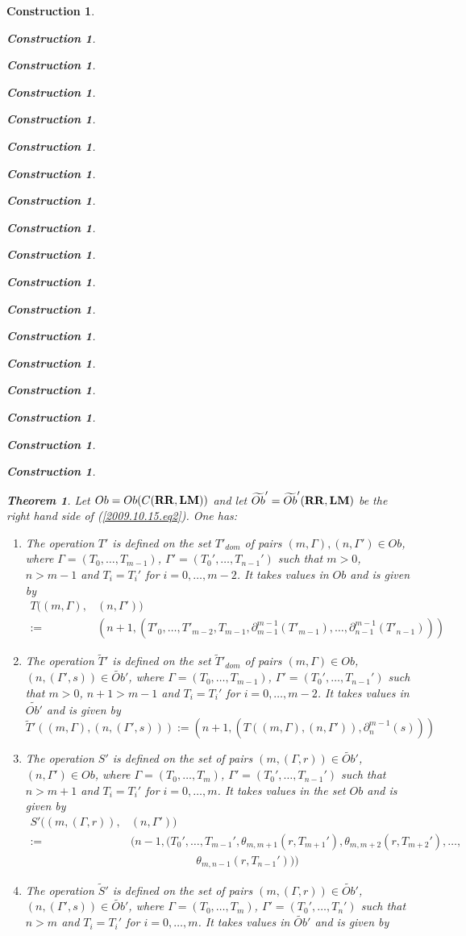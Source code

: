 \documentclass[onecolumn,12pt]{amsart}
\newtheorem{theorem}[proposition]{Theorem}
\numberwithin{proposition}{subsection}
\newtheorem{construction}[proposition]{Construction}
\newcommand{\wt}{\widetilde}
\newcommand{\spc}{{\,\,\,\,\,\,\,}}
\newcommand{\RR}{{\bf RR}}
\newcommand{\LM}{{\bf LM}}
\begin{document}
\begin{construction}
\begin{construction}
\begin{construction}
\begin{construction}
\begin{construction}
\begin{construction}
\begin{construction}
\begin{construction}
\begin{construction}
\begin{construction}
\begin{construction}
\begin{construction}
\begin{construction}
\begin{construction}
\begin{construction}
\begin{construction}
\begin{construction}
\begin{construction}
  
%
\begin{theorem}\label{2015.08.26.th2}
Let $Ob=Ob(C(\RR,\LM))$ and let $\wt{Ob}'=\wt{Ob}'(\RR,\LM)$ be the right hand side of (\ref{2009.10.15.eq2}). One has:
%
\begin{enumerate}
\item The operation $T'$ is defined on the set $T'_{dom}$ of pairs
  $(m,\Gamma),(n,\Gamma')\in Ob$, where $\Gamma=(T_0,\dots,T_{m-1})$,
  $\Gamma'=(T_0',\dots,T_{n-1}')$ such that $m>0$, $n>m-1$ and $T_i=T_i'$ for
  $i=0,\dots,m-2$. It takes values in $Ob$ and is given by
%
\begin{equation*}
  \begin{split}
    T((m,\Gamma),&(n,\Gamma'))
    \\:= &(n+1,(T'_0,\dots,T'_{m-2},T_{m-1},\partial_{m-1}^{m-1}(T'_{m-1}),\dots,\partial_{n-1}^{m-1}(T'_{n-1})))
  \end{split}
\end{equation*}
%
\item The operation $\wt{T}'$ is defined on the set $\wt{T}'_{dom}$ of pairs
  $(m,\Gamma)\in Ob$, $(n,(\Gamma',s))\in\wt{Ob}'$, where
  $\Gamma=(T_0,\dots,T_{m-1})$, $\Gamma'=(T_0',\dots,T_{n-1}')$ such that
  $m>0$, $n+1>m-1$ and $T_i=T_i'$ for $i=0,\dots,m-2$. It takes values in
  $\wt{Ob'}$ and is given by
%
$$\wt{T}'((m,\Gamma),(n,(\Gamma',s))):=(n+1,(T((m,\Gamma),(n,\Gamma')),\partial_{n}^{m-1}(s)))$$
%
\item The operation $S'$ is defined on the set of pairs $(m,(\Gamma,r))\in
  \wt{Ob}'$, $(n,\Gamma')\in Ob$, where $\Gamma=(T_0,\dots,T_{m})$,
  $\Gamma'=(T_0',\dots,T_{n-1}')$ such that $n>m+1$ and $T_i=T_i'$ for
  $i=0,\dots,m$. It takes values in the set $Ob$ and is given by
%
\begin{equation*}
  \begin{split}
    S'((m,(\Gamma,r)),&(n,\Gamma'))
    \\ :=& (n-1,(T_0',\dots,T_{m-1}',\theta_{m,m+1}(r,T_{m+1}'),\theta_{m,m+2}(r,T_{m+2}'),\dots,
    \\  & \spc\spc\spc\spc\spc
    \theta_{m,n-1}(r,T_{n-1}')))
  \end{split}
\end{equation*}
%
\item The operation $\wt{S}'$ is defined on the set of pairs $(m,(\Gamma,r))\in
  \wt{Ob}'$, $(n,(\Gamma',s))\in \wt{Ob}'$, where $\Gamma=(T_0,\dots,T_{m})$,
  $\Gamma'=(T_0',\dots,T_{n}')$ such that $n>m$ and $T_i=T_i'$ for
  $i=0,\dots,m$. It takes values in $\wt{Ob}'$ and is given by
%

\end{enumerate}
\end{theorem}
\end{construction}
\end{construction}
\end{construction}
\end{construction}
\end{construction}
\end{construction}
\end{construction}
\end{construction}
\end{construction}
\end{construction}
\end{construction}
\end{construction}
\end{construction}
\end{construction}
\end{construction}
\end{construction}
\end{construction}
\end{construction}
\end{document}
